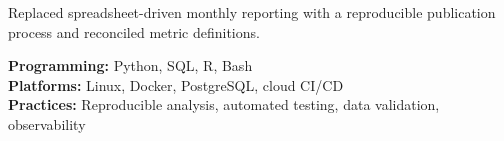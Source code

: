 \documentclass[fontsize=11pt, margin=narrow]{careerdossier-resume}
\begin{document}

\begin{CDossierEntry}[
  title = {Operational Reporting Modernization},
  dates = {2023--2024}
]
  \begin{CDossierItemize}
    \item Replaced spreadsheet-driven monthly reporting with a reproducible
          publication process and reconciled metric definitions.
  \end{CDossierItemize}
\end{CDossierEntry}


\begin{CDossierEntry}[
  title        = {M.Sc. in Software Engineering},
  organization = {McGill University},
  location     = {Montréal, QC},
  dates        = {2019--2021}
]
\end{CDossierEntry}

\begin{CDossierEntry}[
  title        = {B.A.Sc. in Computer Engineering, Honours},
  organization = {University of Waterloo},
  location     = {Waterloo, ON},
  dates        = {2014--2019}
]
\end{CDossierEntry}


\textbf{Programming:} Python, SQL, R, Bash \\
\textbf{Platforms:} Linux, Docker, PostgreSQL, cloud CI/CD \\
\textbf{Practices:} Reproducible analysis, automated testing, data validation,
observability
\end{document}
